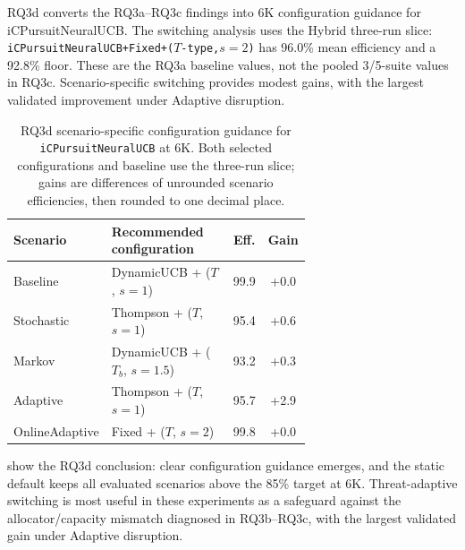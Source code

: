 RQ3d converts the RQ3a--RQ3c findings into 6K configuration guidance for iCPursuitNeuralUCB. The switching analysis uses the Hybrid three-run slice: \texttt{iCPursuitNeuralUCB+Fixed+($T$-type,$s=2$)} has 96.0\% mean efficiency and a 92.8\% floor. These are the RQ3a baseline values, not the pooled 3/5-suite values in RQ3c. Scenario-specific switching provides modest gains, with the largest validated improvement under Adaptive disruption.

\begin{table}[ht!]
\footnotesize
\centering
\setlength{\tabcolsep}{4pt}
\caption{RQ3d scenario-specific configuration guidance for \texttt{iCPursuitNeuralUCB} at 6K. Both selected configurations and baseline use the three-run slice; gains are differences of unrounded scenario efficiencies, then rounded to one decimal place.}
\label{tab:rq3d_deployment_rules}
\begin{tabular}{p{0.24\linewidth} p{0.42\linewidth} c c}
\toprule
\textbf{Scenario} & \textbf{Recommended configuration} & \textbf{Eff.} & \textbf{Gain} \\
\midrule
Baseline & DynamicUCB + ($T$, $s=1$) & 99.9 & +0.0 \\
Stochastic & Thompson + ($T$, $s=1$) & 95.4 & +0.6 \\
Markov & DynamicUCB + ($T_b$, $s=1.5$) & 93.2 & +0.3 \\
Adaptive & Thompson + ($T$, $s=1$) & 95.7 & +2.9 \\
OnlineAdaptive & Fixed + ($T$, $s=2$) & 99.8 & +0.0 \\
\bottomrule
\end{tabular}
\end{table}

 show the RQ3d conclusion: clear configuration guidance emerges, and the static default keeps all evaluated scenarios above the 85\% target at 6K. Threat-adaptive switching is most useful in these experiments as a safeguard against the allocator/capacity mismatch diagnosed in RQ3b--RQ3c, with the largest validated gain under Adaptive disruption.

